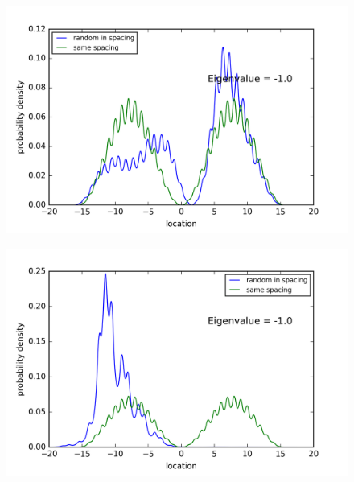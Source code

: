 \begin{figure}[!htbh]
\centering
\begin{minipage}{.45\textwidth}
  \centering
  \includegraphics[width=1.1\linewidth]{Graphics/1_0_2th_Lowest_Rand1_1.png}
  \label{fig:Area1_2thlowestRand1.1}
\end{minipage}\qquad
\begin{minipage}{.45\textwidth}
  \centering
  \includegraphics[width=1.1\linewidth]{Graphics/1_0_2th_Lowest_Rand1_5.png}
  \label{fig:Area1_2thlowestRand1.5}
\end{minipage}
\end{figure}

